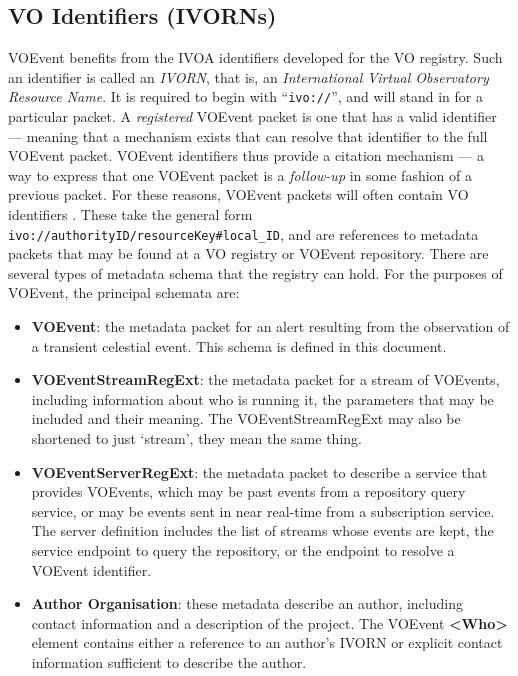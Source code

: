 \documentclass[11pt,a4paper]{ivoa}
\begin{document}
\subsection{VO Identifiers (IVORNs)}
\label{sec:2.2}
VOEvent benefits from the IVOA identifiers developed for the VO registry. Such an identifier is called an \emph{IVORN}, that is, an \emph{International Virtual Observatory Resource Name}. It is required to begin with ``{\tt ivo://}'', and will stand in for a particular packet. A \emph{registered} VOEvent packet is one that has a valid identifier --- meaning that a mechanism exists that can resolve that identifier to the full VOEvent packet. VOEvent identifiers thus provide a citation mechanism --- a way to express that one VOEvent packet is a \emph{follow-up} in some fashion of a previous packet. For these reasons, VOEvent packets will often contain VO identifiers \citep{2016ivoa.spec.0523D}. These take the general form {\tt ivo://authorityID/resourceKey\#local\_ID}, and are references to metadata packets that may be found at a VO registry or VOEvent repository. There are several types of metadata schema that the registry can hold. For the purposes of VOEvent, the principal schemata are:
\begin{itemize}
\item {\bf VOEvent}: the metadata packet for an alert resulting from the observation of a transient celestial event. This schema is defined in this document. 
\item {\bf VOEventStreamRegExt}: the metadata packet for a stream of VOEvents, including information about who is running it, the parameters that may be included and their meaning. The VOEventStreamRegExt may also be shortened to just `stream', they mean the same thing. 
\item {\bf VOEventServerRegExt}: the metadata packet to describe a service that provides VOEvents, which may be past events from a repository query service, or may be events sent in near real-time from a subscription service. The server definition includes the list of streams whose events are kept, the service endpoint to query the repository, or the endpoint to resolve a VOEvent identifier. 
\item {\bf Author Organisation}: these metadata \citep{2007ivoa.spec.0302H} describe an author, including contact information and a description of the project. The VOEvent {\bf <Who>} element contains either a reference to an author's IVORN or explicit contact information sufficient to describe the author. 
\end{itemize}
\end{document}
